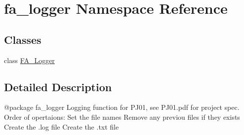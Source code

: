 \hypertarget{namespacefa__logger}{}\section{fa\+\_\+logger Namespace Reference}
\label{namespacefa__logger}
\subsection*{Classes}
\begin{DoxyCompactItemize}
\item 
class \mbox{\hyperlink{classfa__logger_1_1_f_a___logger}{F\+A\+\_\+\+Logger}}
\end{DoxyCompactItemize}


\subsection{Detailed Description}
\begin{DoxyVerb}@package fa_logger
Logging function for PJ01, see PJ01.pdf for project spec. Order of opertaions:
    Set the file names
    Remove any previou files if they exists
    Create the .log file
    Create the .txt file
\end{DoxyVerb}
 